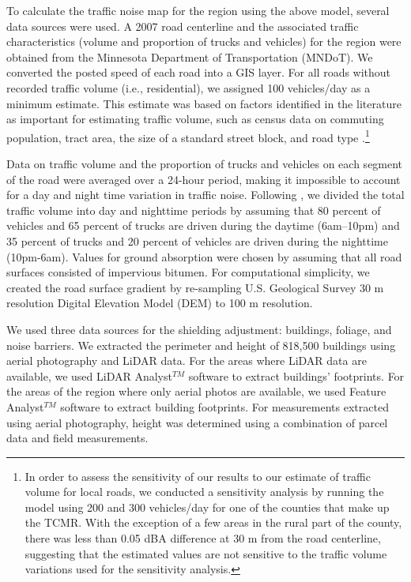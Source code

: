 \documentclass{article}\usepackage{graphicx, color}
\begin{document}
To calculate the traffic noise map for the region using the above model, several data sources were used. A 2007 road centerline and the associated traffic characteristics (volume and proportion of trucks and vehicles) for the region were obtained from the Minnesota Department of Transportation (MNDoT). We converted the posted speed of each road into a GIS layer. For all roads without recorded traffic volume (i.e., residential), we assigned 100 vehicles/day as a minimum estimate. This estimate was based on factors identified in the literature as important for estimating traffic volume, such as census data on commuting population, tract area, the size of a standard street block, and road type \citep{Cheng1992, Fricker1986}.\footnote{In order to assess the sensitivity of our results to our estimate of traffic volume for local roads, we conducted a sensitivity analysis by running the model using 200 and 300 vehicles/day for one of the counties that make up the TCMR. With the exception of a few areas in the rural part of the county, there was less than 0.05 dBA difference at 30 m from the road centerline, suggesting that the estimated values are not sensitive to the traffic volume variations used for the sensitivity analysis.}

Data on traffic volume and the proportion of trucks and vehicles on each segment of the road were averaged over a 24-hour period, making it impossible to account for a day and night time variation in traffic noise. Following \citet{Arditi2007}, we divided the total traffic volume into day and nighttime periods by assuming that 80 percent of vehicles and 65 percent of trucks are driven during the daytime (6am–10pm) and 35 percent of trucks and 20 percent of vehicles are driven during the nighttime (10pm-6am). Values for ground absorption were chosen by assuming that all road surfaces consisted of impervious bitumen. For computational simplicity, we created the road surface gradient by re-sampling U.S. Geological Survey 30 m resolution Digital Elevation Model (DEM) to 100 m resolution. 

We used three data sources for the shielding adjustment: buildings, foliage, and noise barriers. We extracted the perimeter and height of 818,500 buildings using aerial photography and LiDAR data. For the areas where LiDAR data are available, we used LiDAR Analyst$^{TM}$ software to extract buildings’ footprints. For the areas of the region where only aerial photos are available, we used Feature Analyst$^{TM}$ software to extract building footprints. For measurements extracted using aerial photography, height was determined using a combination of parcel data and field measurements. 
\end{document}

